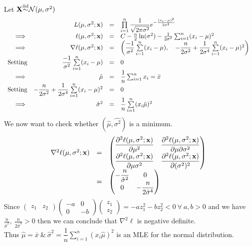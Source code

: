 \documentclass[11pt,a4paper]{article}
\begin{document}
Let $\textbf{X}{\overset{\text{iid}}{\sim}}\mathcal{N}(\mu,\sigma^2)$
\[\begin{array}{rrcl}
&L(\mu,\sigma^2;\textbf{x})&=&\prod\limits_{i=1}^n\dfrac{1}{\sqrt{2\pi\sigma^2}}e^{-\frac{(x_i-\mu)^2}{2\sigma^2}}\\
\implies&\ell(\mu,\sigma^2;\textbf{x})&=&C-\frac{n}{2}\ln(\sigma^2)-\frac{1}{2\sigma^2}\sum_{i=1}^n(x_i-\mu)^2\\
\implies&\nabla\ell(\mu,\sigma^2;\textbf{x})&=&\left(\dfrac{-1}{\sigma^2}\sum\limits_{i=1}^n(x_i-\mu),\quad-\dfrac{n}{2\sigma^2}+\dfrac{1}{2\sigma^4}\sum\limits_{i=1}^n(x_i-\mu)^2\right)\\
\text{Setting}&\dfrac{-1}{\sigma^2}\sum\limits_{i=1}^n(x_i-\mu)&=&0\\
\implies&\hat{\mu}&=&\dfrac{1}{n}\sum_{i=1}^nx_i=\bar{x}\\
\text{Setting}&-\dfrac{n}{2\sigma^2}+\dfrac{1}{2\sigma^4}\sum\limits_{i=1}^n(x_i-\mu)^2&=&0\\
\implies&\hat{\sigma}^2&=&\dfrac{1}{n}\sum\limits_{i=1}^n(x_i\hat{\mu})^2
\end{array}\]
We now want to check whether $(\hat{\mu},\hat{\sigma^2})$ is a minimum.\\
\[\begin{array}{rcl}
\nabla^2\ell(\mu,\sigma^2;\textbf{x})&=&\begin{pmatrix}
\dfrac{\partial^2\ell(\mu,\sigma^2;\textbf{x})}{\partial\mu^2}&\dfrac{\partial^2\ell(\mu,\sigma^2;\textbf{x})}{\partial\mu\partial\sigma^2}\\
\dfrac{\partial^2\ell(\mu,\sigma^2;\textbf{x})}{\partial\mu\sigma^2}&\dfrac{\partial^2\ell(\mu,\sigma^2;\textbf{x})}{\partial(\sigma^2)^2}
\end{pmatrix}\\
&=&\begin{pmatrix}
-\dfrac{n}{\hat{\sigma}^2}&0\\
0&-\dfrac{n}{2\hat{\sigma}^4}
\end{pmatrix}
\end{array}\]
Since $\begin{pmatrix}z_1&z_2\end{pmatrix}\begin{pmatrix}-a&0\\0&-b\end{pmatrix}\begin{pmatrix}z_1\\z_2\end{pmatrix}=-az_1^2-bz_2^2<0\ \forall\ a,b>0$ and we have $\frac{n}{\hat{\sigma}^2},\ \frac{n}{2\hat{\sigma}^4}>0$ then we can conclude that $\nabla^2\ell$ is negative definite.\\
Thus $\hat{\mu}=\bar{x}\ \&\ \hat{\sigma}^2=\dfrac{1}{n}\sum\limits_{i=1}^n(x_i\hat{\mu})^2$ is an MLE for the normal distribution.\\
\end{document}

